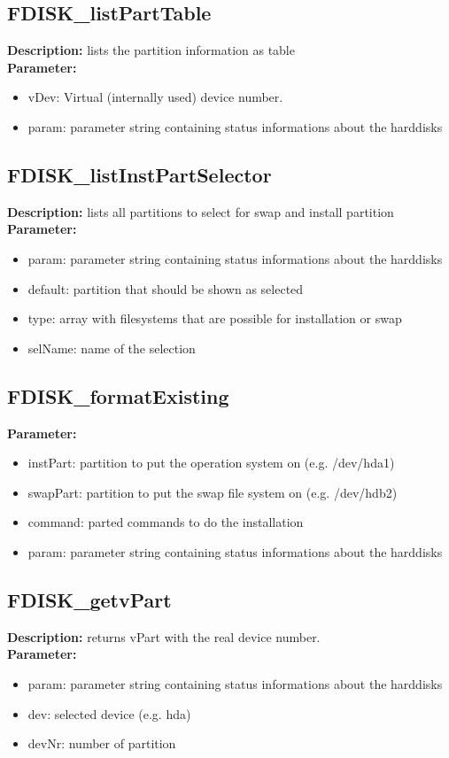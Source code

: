 \subsection{FDISK\_listPartTable}
\textbf{Description:} lists the partition information as table\\
\textbf{Parameter:}
\begin{itemize}
\item vDev: Virtual (internally used) device number.
\item param: parameter string containing status informations about the harddisks
\end{itemize}

\subsection{FDISK\_listInstPartSelector}
\textbf{Description:} lists all partitions to select for swap and install partition\\
\textbf{Parameter:}
\begin{itemize}
\item param: parameter string containing status informations about the harddisks
\item default: partition that should be shown as selected
\item type: array with filesystems that are possible for installation or swap
\item selName: name of the selection
\end{itemize}

\subsection{FDISK\_formatExisting}
\textbf{Parameter:}
\begin{itemize}
\item instPart: partition to put the operation system on (e.g. /dev/hda1)
\item swapPart: partition to put the swap file system on (e.g. /dev/hdb2)
\item command: parted commands to do the installation
\item param: parameter string containing status informations about the harddisks
\end{itemize}

\subsection{FDISK\_getvPart}
\textbf{Description:} returns vPart with the real device number.\\
\textbf{Parameter:}
\begin{itemize}
\item param: parameter string containing status informations about the harddisks
\item dev: selected device (e.g. hda)
\item devNr: number of partition
\end{itemize}

